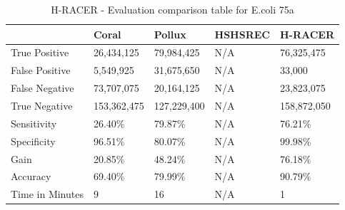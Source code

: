\documentclass[12pt,openany]{llncs}
\begin{document}
\begingroup
\renewcommand\arraystretch{3}
\begin{longtable}{|m{33mm}|m{20mm}|m{20mm}|m{20mm}|m{20mm}|}
	    \caption{\label{tab:eval-3}H-RACER - Evaluation comparison table for E.coli 75a}\\
        \hline
           & Coral & Pollux & HSHSREC & H-RACER\cellcolor{DarkGray} \\ %
        \hline
           True Positive & 26,434,125 & 79,984,425 & N/A & 76,325,475\cellcolor{LightGray} \\ %
        \hline
           False Positive & 5,549,925 & 31,675,650 & N/A & 33,000\cellcolor{LightGray} \\ %
        \hline
           False Negative & 73,707,075 & 20,164,125 & N/A & 23,823,075\cellcolor{LightGray} \\ %
        \hline
           True Negative & 153,362,475 & 127,229,400 & N/A & 158,872,050\cellcolor{LightGray} \\ %
        \hline
           Sensitivity & 26.40\% & 79.87\% & N/A & 76.21\%\cellcolor{LightGray} \\ %
        \hline
           Specificity & 96.51\% & 80.07\% & N/A & 99.98\%\cellcolor{LightGray} \\ %
        \hline
           Gain & 20.85\% & 48.24\% & N/A & 76.18\%\cellcolor{LightGray} \\ %
        \hline
           Accuracy & 69.40\% & 79.99\% & N/A & 90.79\%\cellcolor{LightGray} \\ %
        \hline
           Time in Minutes& 9 & 16 & N/A & 1\cellcolor{LightGray} \\ %
        \hline
\end{longtable}
\endgroup

\newpage
\end{document}
